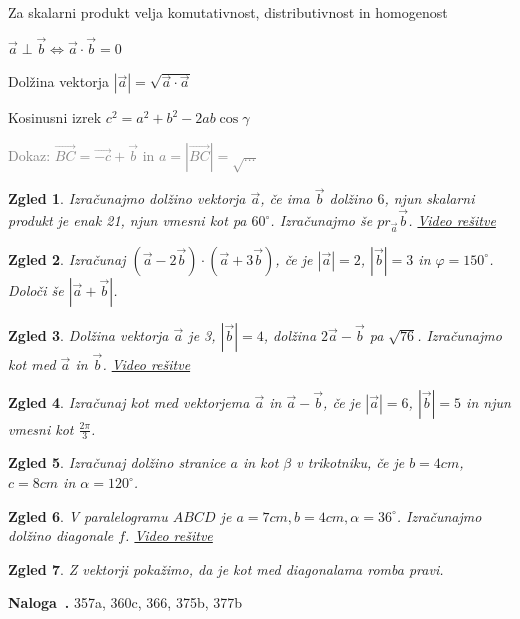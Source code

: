 \documentclass{article}
\newcounter{example}[section]
\newenvironment{example}[1][]{\refstepcounter{example}\par\medskip
   \noindent \textbf{Naloga~\theexample. #1} \rmfamily}{\medskip}
\newtheorem*{zgled}{Zgled}
\begin{document}
Za skalarni produkt velja komutativnost, distributivnost in homogenost

$\vec{a} \perp\vec{b} \iff \vec{a}\cdot\vec{b}=0$

Dolžina vektorja $|\vec{a}|=\sqrt{\vec{a}\cdot\vec{a}}$

Kosinusni izrek $c^2=a^2+b^2-2ab\cos\gamma$

\textcolor{gray}{Dokaz: $\vec{BC}=\vec{-c}+\vec{b}$ in $a=|\vec{BC}|=\sqrt{\ldots}$}

\begin{zgled}
    Izračunajmo dolžino vektorja $\vec{a}$, če ima $\vec{b}$ dolžino $6$, njun skalarni produkt je enak 21, njun vmesni kot pa $60^\circ$. Izračunajmo še $pr_{\vec{a}}\vec{b}$.
    \href{https://youtu.be/PCUppodHkyY}{Video rešitve}
\end{zgled}

\begin{zgled}
    Izračunaj $(\vec{a}-2\vec{b})\cdot (\vec{a}+3\vec{b})$, če je $|\vec{a}|=2$, $|\vec{b}|=3$ in $\varphi=150^\circ$. Določi še $|\vec{a}+\vec{b}|$.
\end{zgled}

\begin{zgled}
    Dolžina vektorja $\vec{a}$ je 3, $|\vec{b}|=4$, dolžina $2\vec{a}-\vec{b}$ pa $\sqrt{76}$. Izračunajmo kot med $\vec{a}$ in $\vec{b}$.
    \href{https://youtu.be/xMxlB981-ek}{Video rešitve}
\end{zgled}

\begin{zgled}
    Izračunaj kot med vektorjema $\vec{a}$ in $\vec{a}-\vec{b}$, če je $|\vec{a}|=6$, $|\vec{b}|=5$ in njun vmesni kot $\frac{2\pi}{3}$.
\end{zgled}

\begin{zgled}
    Izračunaj dolžino stranice $a$ in kot $\beta$ v trikotniku, če je $b=4cm$, $c=8cm$ in $\alpha =120^\circ$.
\end{zgled}

\begin{zgled}
    V paralelogramu $ABCD$ je $a=7cm, b=4cm, \alpha=36^\circ$. Izračunajmo dolžino diagonale $f$.
    \href{https://youtu.be/cA2GKU8gsrw}{Video rešitve}
\end{zgled}

\begin{zgled}
    Z vektorji pokažimo, da je kot med diagonalama romba pravi.
\end{zgled}

\begin{example}
    357a, 360c, 366, 375b, 377b
\end{example}
\end{document}
